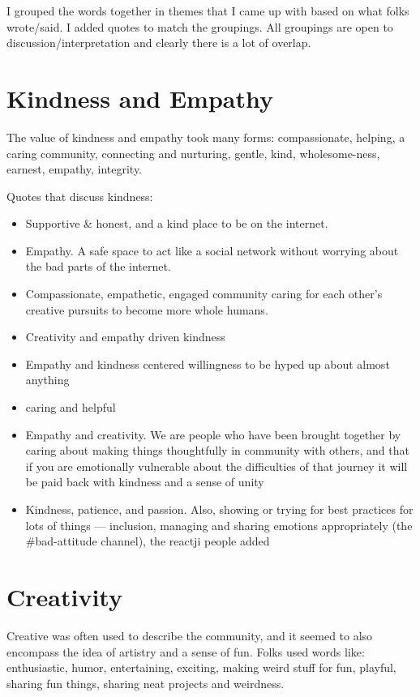\documentclass[
]{book}
\providecommand{\tightlist}{%
  \setlength{\itemsep}{0pt}\setlength{\parskip}{0pt}}
\begin{document}
I grouped the words together in themes that I came up with based on what folks wrote/said. I added quotes to match the groupings. All groupings are open to discussion/interpretation and clearly there is a lot of overlap.

\section{Kindness and Empathy}\label{kindness-and-empathy}

The value of kindness and empathy took many forms: compassionate, helping, a caring community, connecting and nurturing, gentle, kind, wholesome-ness, earnest, empathy, integrity.

Quotes that discuss kindness:

\begin{itemize}
\tightlist
\item
  Supportive \& honest, and a kind place to be on the internet.
\item
  Empathy. A safe space to act like a social network without worrying about the bad parts of the internet.
\item
  Compassionate, empathetic, engaged community caring for each other's creative pursuits to become more whole humans.
\item
  Creativity and empathy driven kindness
\item
  Empathy and kindness centered willingness to be hyped up about almost anything
\item
  caring and helpful
\item
  Empathy and creativity. We are people who have been brought together by caring about making things thoughtfully in community with others, and that if you are emotionally vulnerable about the difficulties of that journey it will be paid back with kindness and a sense of unity
\item
  Kindness, patience, and passion. Also, showing or trying for best practices for lots of things --- inclusion, managing and sharing emotions appropriately (the \#bad-attitude channel), the reactji people added
\end{itemize}

\section{Creativity}\label{creativity}

Creative was often used to describe the community, and it seemed to also encompass the idea of artistry and a sense of fun. Folks used words like: enthusiastic, humor, entertaining, exciting, making weird stuff for fun, playful, sharing fun things, sharing neat projects and weirdness.
\end{document}
